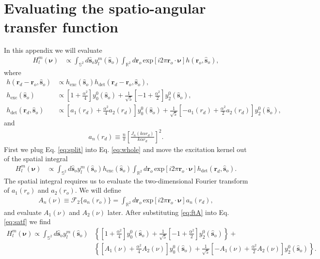 \documentclass{osa-article}
\providecommand{\ro}[1]{\mathbf{\mathbf{r}}_o}
\providecommand{\so}[1]{\mathbf{\hat{s}}_o}
\providecommand{\rd}[1]{\mathbf{r}_d}
\providecommand{\mbb}[1]{\mathbb{#1}}
\providecommand{\bs}[1]{\boldsymbol{#1}}
\begin{document}
\section{Evaluating the spatio-angular transfer function}
In this appendix we will evaluate 
\begin{align}
    H_l^m(\bs{\nu}) &\propto \int_{\mbb{S}^2}d\so{}y_l^m(\so{})\int_{\mbb{R}^2}d\ro{}\,\text{exp}\left[i2\pi \ro{}\cdot\bs{\nu}\right]h(\ro{}, \so{}),\label{eq:whole}
\end{align}
where
\begin{align}
  h(\rd{} - \ro{}, \so{}) &\propto h_{\text{exc}}(\so{})h_{\text{det}}(\rd{} - \ro{}, \so{}),\label{eq:split}\\ 
  h_{\text{exc}}(\so{}) &\propto \left[1 + \frac{\alpha^2}{4}\right]y_0^0(\so{}) + \frac{1}{\sqrt{5}}\left[-1 + \frac{\alpha^2}{2}\right]y_2^0(\so{}),\\  
  h_{\text{det}}(\rd{}, \so{}) &\propto \left[a_1( r_d) + \frac{\alpha^2}{4} a_2( r_d)\right]y_0^0(\so{}) + \frac{1}{\sqrt{5}}\left[- a_1( r_d) + \frac{\alpha^2}{2} a_2( r_d)\right]y_2^0(\so{}),
\end{align}
and
\begin{align}
    a_n(r_d) \equiv \frac{n}{\pi}\left[\frac{J_n(k\alpha r_d)}{k\alpha r_d}\right]^2. 
\end{align}
First we plug Eq. \ref{eq:split} into Eq. \ref{eq:whole} and move the excitation
kernel out of the spatial integral
\begin{align}
    H_l^m(\bs{\nu}) &\propto \int_{\mbb{S}^2}d\so{}y_l^m(\so{})h_{\text{exc}}(\so{})\int_{\mbb{R}^2}d\ro{}\,\text{exp}\left[i2\pi \ro{}\cdot\bs{\nu}\right]h_{\text{det}}(\rd{}, \so{}). \label{eq:satf}
\end{align}
The spatial integral requires us to evaluate the two-dimensional Fourier
transform of $a_1(r_o)$ and $a_2(r_o)$. We will define
\begin{align}
  A_n(\nu) \equiv \mathcal{F}_2\{a_n(r_o)\} =  \int_{\mbb{R}^2}d\ro{}\,\text{exp}\left[i2\pi \ro{}\cdot\bs{\nu}\right] a_n(r_d), \label{eq:ftA}
\end{align}
and evaluate $A_1(\nu)$ and $A_2(\nu)$ later. After substituting \ref{eq:ftA}
into Eq. \ref{eq:satf} we find 
\begin{align}
  H_l^m(\bs{\nu}) \propto \int_{\mbb{S}^2}d\so{}y_l^m(\so{})&\left\{\left[1 + \frac{\alpha^2}{4}\right]y_0^0(\so{}) + \frac{1}{\sqrt{5}}\left[-1 + \frac{\alpha^2}{2}\right]y_2^0(\so{})\right\} + \nonumber\\&\left\{\left[A_1(\nu) + \frac{\alpha^2}{4} A_2(\nu)\right]y_0^0(\so{}) + \frac{1}{\sqrt{5}}\left[- A_1(\nu) + \frac{\alpha^2}{2} A_2(\nu)\right]y_2^0(\so{})\right\}. 
\end{align}
\end{document}
